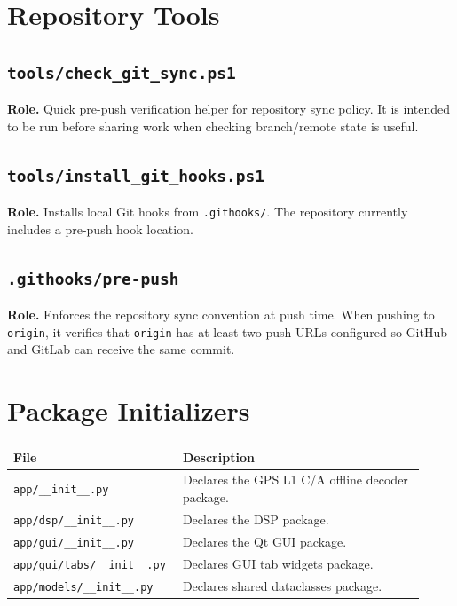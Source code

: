 \documentclass[11pt,a4paper]{article}
\newcommand{\codepath}[1]{\nolinkurl{#1}}
\newcommand{\codeheading}[1]{\texorpdfstring{\codepath{#1}}{#1}}
\begin{document}
\section{Repository Tools}

\subsection{\codeheading{tools/check_git_sync.ps1}}

\textbf{Role.} Quick pre-push verification helper for repository sync policy. It is intended to be run before sharing work when checking branch/remote state is useful.

\subsection{\codeheading{tools/install_git_hooks.ps1}}

\textbf{Role.} Installs local Git hooks from \codepath{.githooks/}. The repository currently includes a pre-push hook location.

\subsection{\codeheading{.githooks/pre-push}}

\textbf{Role.} Enforces the repository sync convention at push time. When pushing to \texttt{origin}, it verifies that \texttt{origin} has at least two push URLs configured so GitHub and GitLab can receive the same commit.

\section{Package Initializers}

\begin{longtable}{P{0.34\linewidth}L{0.58\linewidth}}
\textbf{File} & \textbf{Description}\\
\hline
\codepath{app/__init__.py} & Declares the GPS L1 C/A offline decoder package.\\
\codepath{app/dsp/__init__.py} & Declares the DSP package.\\
\codepath{app/gui/__init__.py} & Declares the Qt GUI package.\\
\codepath{app/gui/tabs/__init__.py} & Declares GUI tab widgets package.\\
\codepath{app/models/__init__.py} & Declares shared dataclasses package.\\
\end{longtable}
\end{document}
